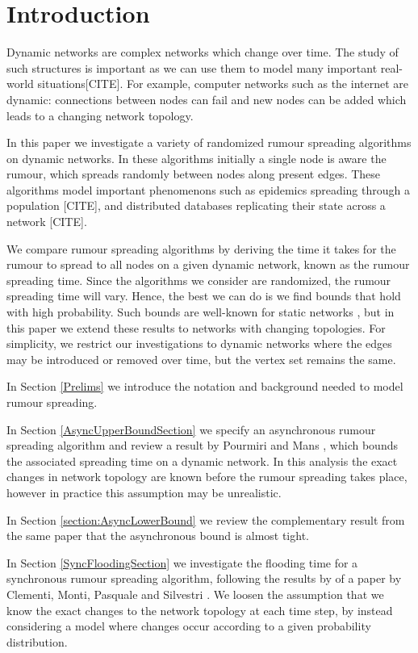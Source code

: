 \section{Introduction}

Dynamic networks are complex networks which change over time. The study of such structures is important as we can use them to model many important real-world situations[CITE]. For example, computer networks such as the internet are dynamic: connections between nodes can fail and new nodes can be added which leads to a changing network topology. 

In this paper we investigate a variety of randomized rumour spreading algorithms on dynamic networks. In these algorithms initially a single node is aware the rumour, which spreads randomly between nodes along present edges. These algorithms model important phenomenons such as epidemics spreading through a population [CITE], and distributed databases replicating their state across a network [CITE]. 

We compare rumour spreading algorithms by deriving the time it takes for the rumour to spread to all nodes on a given dynamic network, known as the rumour spreading time. Since the algorithms we consider are randomized, the rumour spreading time will vary. Hence, the best we can do is we find bounds that hold with high probability. Such bounds are well-known for static networks \cite{complexNetworksRumourSpreading}, but in this paper we extend these results to networks with changing topologies. For simplicity, we restrict our investigations to dynamic networks where the edges may be introduced or removed over time, but the vertex set remains the same.

In Section \ref{Prelims} we introduce the notation and background needed to model rumour spreading.

In Section \ref{AsyncUpperBoundSection} we specify an asynchronous rumour spreading algorithm and review a result by Pourmiri and Mans \cite{asyncPaper}, which bounds the associated spreading time on a dynamic network. In this analysis the exact changes in network topology are known before the rumour spreading takes place, however in practice this assumption may be unrealistic.

In Section \ref{section:AsyncLowerBound} we review the complementary result from the same paper \cite{asyncPaper} that the asynchronous bound is almost tight.

In Section \ref{SyncFloodingSection} we investigate the flooding time for a synchronous rumour spreading algorithm, following the results by of a paper by Clementi, Monti, Pasquale and Silvestri \cite{syncPaper}. We loosen the assumption that we know the exact changes to the network topology at each time step, by instead considering a model where changes occur according to a given probability distribution.


